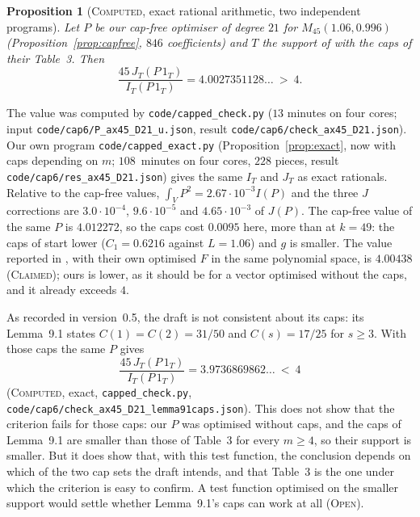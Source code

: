 \documentclass[11pt]{amsart}
\newtheorem{proposition}[theorem]{Proposition}
\theoremstyle{definition}
\theoremstyle{remark}
\newcommand{\lbl}[1]{\textup{\textsc{#1}}}
\begin{document}
\begin{proposition}[\lbl{Computed}, exact rational arithmetic, two independent programs]\label{prop:cha-capped}
Let $P$ be our cap-free optimiser of degree $21$ for
$M_{45}(1.06,0.996)$ (Proposition~\ref{prop:capfree}, $846$ coefficients) and
$T$ the support of \cite{Cha26} with the caps of their Table~3. Then
\[
\frac{45\,J_T(P\,1_T)}{I_T(P\,1_T)}=4.0027351128\ldots\ >\ 4 .
\]
\end{proposition}

\begin{sloppypar}
The value was computed by \texttt{code/capped\_check.py} ($13$ minutes on four
cores; input \texttt{code/cap6/P\_ax45\_D21\_u.json}, result
\texttt{code/cap6/check\_ax45\_D21.json}). Our own program \texttt{code/capped\_exact.py}
(Proposition~\ref{prop:exact}, now with caps depending on $m$; $108$~minutes
on four cores, $228$ pieces, result \texttt{code/cap6/res\_ax45\_D21.json})
gives the same $I_T$ and $J_T$ as exact rationals. Relative to the cap-free
values, $\int_VP^2=2.67\cdot10^{-3}I(P)$ and the three $J$ corrections are
$3.0\cdot10^{-4}$, $9.6\cdot10^{-5}$ and $4.65\cdot10^{-3}$ of $J(P)$. The cap-free value of the
same $P$ is $4.012272$, so the caps cost $0.0095$ here, more than at $k=49$:
the caps of \cite{Cha26} start lower ($C_1=0.6216$ against $L=1.06$) and
$g$ is smaller. The value reported in \cite[Thm.~11.1]{Cha26}, with their own
optimised $F$ in the same polynomial space, is $4.00438$ (\lbl{Claimed});
ours is lower, as it should be for a vector optimised without the caps, and
it already exceeds $4$.
\end{sloppypar}

As recorded in version~0.5, the draft \cite{Cha26} is not consistent about
its caps: its Lemma~9.1 states $C(1)=C(2)=31/50$ and $C(s)=17/25$ for
$s\ge3$. With those caps the same $P$ gives
\[
\frac{45\,J_T(P\,1_T)}{I_T(P\,1_T)}=3.9736869862\ldots\ <\ 4
\]
(\lbl{Computed}, exact, \texttt{capped\_check.py},
\texttt{code/cap6/check\_ax45\_D21\_lemma91caps.json}).
This does not show that the criterion fails for those caps: our $P$
was optimised without caps, and the caps of Lemma~9.1 are smaller than those
of Table~3 for every $m\ge4$, so their support is smaller. But it does show
that, with this test function, the conclusion depends on which of the two
cap sets the draft intends, and that Table~3 is the one under which the
criterion is easy to confirm. A test function optimised on the smaller support
would settle whether Lemma~9.1's caps can work at all (\lbl{Open}).
\end{document}
